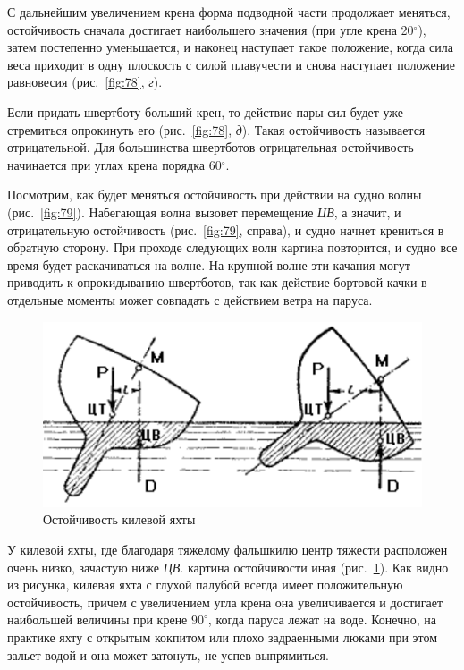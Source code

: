 \documentclass[a4paper, 12pt, twoside, final]{scrbook}
\begin{document}
С дальнейшим увеличением крена форма подводной части продолжает меняться, остойчивость сначала достигает наибольшего значения (при угле крена 20$^\circ$), затем постепенно уменьшается, и наконец наступает такое положение, когда сила веса приходит в одну плоскость с силой плавучести и снова наступает положение равновесия (рис.~\ref{fig:78}, \textit{г}).

Если придать швертботу больший крен, то действие пары сил будет уже стремиться опрокинуть его (рис.~\ref{fig:78}, \textit{д}). Такая остойчивость называется отрицательной. Для большинства швертботов отрицательная остойчивость начинается при углах крена порядка 60$^\circ$.

Посмотрим, как будет меняться остойчивость при действии на судно волны (рис.~\ref{fig:79}). Набегающая волна вызовет перемещение \textit{ЦВ}, а значит, и отрицательную остойчивость (рис.~\ref{fig:79}, справа), и судно начнет крениться в обратную сторону. При проходе следующих волн картина повторится, и судно все время будет раскачиваться на волне. На крупной волне эти качания могут приводить к опрокидыванию швертботов, так как действие бортовой качки в отдельные моменты может совпадать с действием ветра на паруса. 

\begin{figure}
   \centering
   \includegraphics{pics/80_Ostojchevost_kilevoj_yakhty} %
   \caption{Остойчивость килевой яхты}
   \label{fig:80}
\end{figure}

У килевой яхты, где благодаря тяжелому фальшкилю центр тяжести расположен очень низко, зачастую ниже \textit{ЦВ}. картина остойчивости иная (рис.~\ref{fig:80}). Как видно из рисунка, килевая яхта с глухой палубой всегда имеет положительную остойчивость, причем с увеличением угла крена она увеличивается и достигает наибольшей величины при крене $90^\circ$, когда паруса лежат на воде. Конечно, на практике яхту с открытым кокпитом или плохо задраенными люками при этом зальет водой и она может затонуть, не успев выпрямиться.
\end{document}
